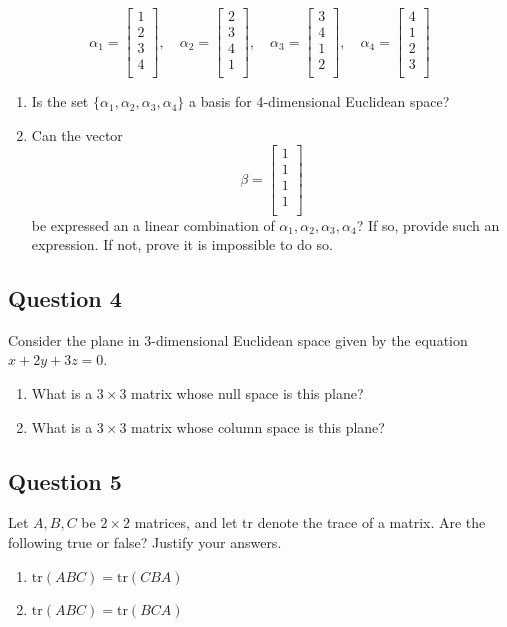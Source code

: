 \documentclass[12pt, a4paper]{article}
\begin{document}
\[
 \alpha_1 = \begin{bmatrix}
  1 \\
  2 \\
  3 \\
  4 \\
\end{bmatrix},
\quad
\alpha_2 = \begin{bmatrix}
  2 \\
  3 \\
  4 \\
  1 \\
\end{bmatrix},
\quad
\alpha_3 = \begin{bmatrix}
  3 \\
  4 \\
  1 \\
  2 \\
\end{bmatrix},
\quad
\alpha_4 = \begin{bmatrix}
  4 \\
  1 \\
  2 \\
  3 \\
\end{bmatrix}
\]
\begin{enumerate}
\item Is the set $\{ \alpha_1, \alpha_2, \alpha_3, \alpha_4 \}$ a basis for 4-dimensional Euclidean space?
\item Can the vector
  \[
  \beta = \begin{bmatrix}
  1 \\
  1 \\
  1 \\
  1 \\
\end{bmatrix}
  \]
  be expressed an a linear combination of $\alpha_1,\alpha_2,\alpha_3,\alpha_4$? If so, provide such an expression. If not, prove it is impossible to do so.
\end{enumerate}

  

\subsection*{Question 4}
Consider the plane in 3-dimensional Euclidean space given by the equation $x + 2y + 3z = 0$.
\begin{enumerate}
\item What is a $3 \times 3$ matrix whose null space is this plane?
\item What is a $3 \times 3$ matrix whose column space is this plane?
 \end{enumerate} 



\subsection*{Question 5}
Let $A,B,C$ be $2 \times 2$ matrices, and let $\text{tr}$ denote the trace of a matrix. Are the following true or false? Justify your answers.
\begin{enumerate}
\item $\text{tr}(ABC) = \text{tr}(CBA)$
  \item $\text{tr}(ABC) = \text{tr}(BCA)$
  \end{enumerate}
\end{document}
